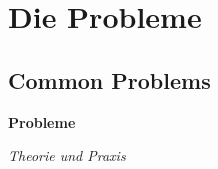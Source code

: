 \documentclass[aspectratio=169,x11names]{beamer}
\begin{document}

\section{Die Probleme}


\subsection{Common Problems}

\begin{frame}
\begin{center}
\Huge
\textbf{Probleme} \bigskip

\huge \textit{Theorie und Praxis}
\end{center}
\end{frame}
\end{document}
